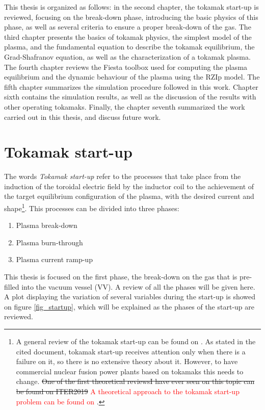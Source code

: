 \documentclass[a4paper,12pt,oneside]{book}
\begin{document}
This thesis is organized as follows: in the second chapter, the tokamak start-up is reviewed, focusing on the break-down phase, introducing the basic physics of this phase, as well as several criteria to ensure a proper break-down of the gas.
The third chapter presents the basics of tokamak physics, the simplest model of the plasma, and the fundamental equation to describe the tokamak equilibrium, the Grad-Shafranov equation, as well as the characterization of a tokamak plasma. 
The fourth chapter reviews the Fiesta toolbox used for computing the plasma equilibrium and the dynamic behaviour of the plasma using the RZIp model.
The fifth chapter summarizes the simulation procedure followed in this work.
Chapter sixth contains the simulation results, as well as the discussion of the results with other operating tokamaks.
Finally, the chapter seventh summarized the work carried out in this thesis, and discuss future work.





\chapter{Tokamak start-up}

The words \textit{Tokamak start-up} refer to the processes that take place from the induction of the toroidal electric field by the inductor coil to the achievement of the target equilibrium configuration of the plasma, with the desired current and shape\footnote{A general review of the tokamak start-up can be found on \cite{MuellerStartup}. As stated in the cited document, tokamak start-up receives attention only when there is a failure on it, so there is no extensive theory about it. However, to have commercial nuclear fusion power plants based on tokamaks this needs to change. \st{One of the first theoretical reviewsI have ever seen on this topic can be found on ITER2019} \textcolor{red}{A theoretical approach to the tokamak start-up problem can be found on \cite{ITER_2019}}.}. This processes can be divided into three phases:
%
%
\begin{enumerate}
	\item Plasma break-down
	\item Plasma burn-through
	\item Plasma current ramp-up
\end{enumerate}

This thesis is focused on the first phase, the break-down on the gas that is pre-filled into the vacuum vessel (VV). A review of all the phases will be given here. A plot displaying the variation of several variables during the start-up is showed on figure \ref{fig_startup}, which will be explained as the phases of the start-up are reviewed.
\end{document}

